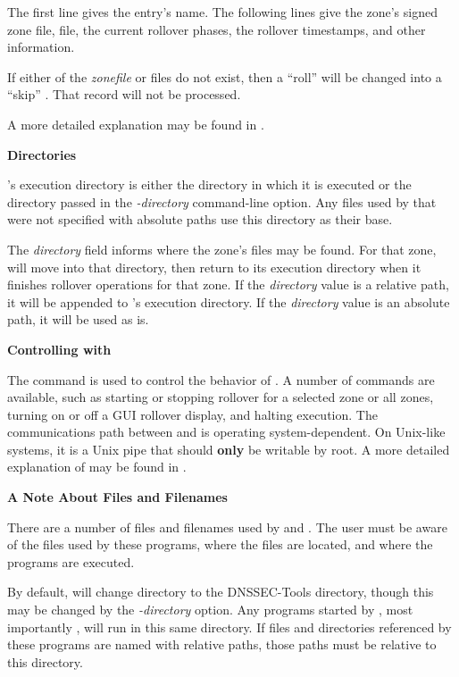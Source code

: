 The first line gives the  entry's name.  The following lines
give the zone's signed zone file,  file, the current rollover
phases, the rollover timestamps, and other information.

If either of the {\it zonefile} or  files do not exist, then a
``roll''  will be changed into a ``skip'' .
That record will not be processed.

A more detailed explanation may be found in .

{\bf Directories}

's execution directory is either the directory in which it is
executed or the directory passed in the {\it -directory} command-line option.
Any files used by  that were not specified with absolute paths use
this directory as their base.

The {\it directory} field informs  where the zone's files may be
found.  For that zone,  will move into that directory, then
return to its execution directory when it finishes rollover operations for
that zone.  If the {\it directory} value is a relative path, it will be
appended to 's execution directory.  If the {\it directory} value
is an absolute path, it will be used as is.

{\bf Controlling  with }

The  command is used to control the behavior of .
A number of commands are available, such as starting or stopping rollover for
a selected zone or all zones, turning on or off a GUI rollover display, and
halting  execution.  The communications path between
 and  is operating system-dependent.  On Unix-like
systems, it is a Unix pipe that should {\bf only} be writable by root.
A more detailed explanation of  may be found in .

{\bf A Note About Files and Filenames}

There are a number of files and filenames used by  and
.  The user must be aware of the files used by these programs,
where the files are located, and where the programs are executed.

By default,  will change directory to the DNSSEC-Tools directory,
though this may be changed by the {\it -directory} option.  Any programs
started by , most importantly , will run in this
same directory.  If files and directories referenced by these programs are
named with relative paths, those paths must be relative to this directory.

